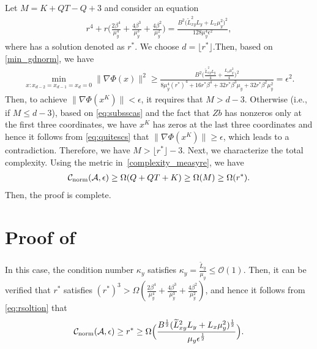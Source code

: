 \documentclass{osudissert96}
\begin{document}
Let $M = K+QT-Q+3$ and consider an equation 
\begin{align}\label{d_eqtion}
r^4 +r \Big(\frac{2\beta^4}{\mu_y^4}+\frac{4\beta^3}{\mu_y^3}+\frac{4\beta^2}{\mu_y^2}\Big) = \frac{B^2\Big(\widetilde L^2_{xy}L_y+L_x\mu_y^2\Big)^2}{128\mu_y^4\epsilon^2},
\end{align}
where has a solution denoted as $r^*$.  
We choose $d = \lfloor r^* \rfloor$.Then, based on  \cref{min_gdnorm}, we have
\begin{align}\label{eq:quitescs}
\min_{x: x_{d-2}=x_{d-1}=x_d=0} \|\nabla\Phi(x)\|^2 \geq  \frac{B^2\Big(\frac{\widetilde L^2_{xy}L_y}{4}+\frac{L_x\mu_y^2}{4}\Big)^2}{8\mu_y^4(r^*)^4 +16r^*\beta^4+32r^*\beta^3\mu_y+32r^*\beta^2\mu_y^2} = \epsilon^2.
\end{align}
Then, to achieve $\|\nabla\Phi(x^K)\|< \epsilon$, it requires that $M> d-3$. Otherwise (i.e., if $M\leq d-3$), based on \cref{eq:subsscas} and the fact that $Zb$ has nonzeros only at the first three coordinates, we have $x^K$ has zeros at the last three coordinates and hence it follows from \cref{eq:quitescs} that 
$\|\nabla \Phi(x^K)\|\geq \epsilon$, which leads to a contradiction. Therefore, we have $M>  \lfloor r^* \rfloor-3$. Next, we characterize the total complexity.  Using the metric in~\cref{complexity_measyre}, we have 
\begin{align*} 
\mathcal{C}_{\text{\normalfont norm}}(\mathcal{A},\epsilon)\geq  \Omega(Q+QT+K) \geq  \Omega(M) \geq  \Omega(r^*).
\end{align*}
 Then, the proof is complete. 
\section{Proof of }
In this case, the condition number $\kappa_y$ satisfies $\kappa_y=\frac{\widetilde L_y}{\mu_y}\leq \mathcal{O}(1)$.
Then, it can be verified that $r^*$ satisfies $(r^*)^3> \Omega (\frac{2\beta^4}{\mu_y^4}+\frac{4\beta^3}{\mu_y^3}+\frac{4\beta^2}{\mu_y^2})$, and hence it follows from \cref{eq:rsoltion} that 
\begin{align*}
\mathcal{C}_{\text{\normalfont norm}}(\mathcal{A},\epsilon) \geq r^*\geq \Omega \Big(\frac{B^{\frac{1}{2}}(\widetilde L^2_{xy}L_y+L_x\mu_y^2)^{\frac{1}{2}}}{\mu_y\epsilon^{\frac{1}{2}}} \Big).
\end{align*}
\end{document}
